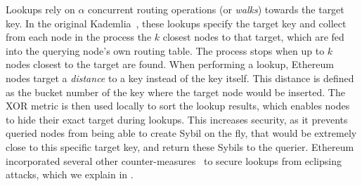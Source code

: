 Lookups rely on $\alpha$ concurrent routing operations (or \emph{walks}) towards the target key.
In the original Kademlia~\cite{maymounkov2002kademlia}, these lookups specify the target key and collect from each node in the process the $k$ closest nodes to that target, which are fed into the querying node's own routing table.
The process stops when up to $k$ nodes closest to the target are found. %
When performing a lookup, Ethereum nodes target a \emph{distance} to a key instead of the key itself.
This distance is defined as the bucket number of the key where the target node would be inserted. 
The XOR metric is then used locally to sort the lookup results, which enables nodes to hide their exact target during lookups. %
This increases security, as it prevents queried nodes from being able to create Sybil on the fly, that would be extremely close to this specific target key, and return these Sybils to the querier.
Ethereum incorporated several other counter-measures~\cite{marcus2018low, henningsen2019eclipsing} to secure lookups from eclipsing attacks, which we explain in .



